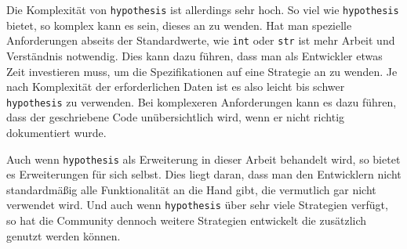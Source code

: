 Die Komplexität von \lstinline{hypothesis} ist allerdings sehr hoch. So viel wie
\lstinline{hypothesis} bietet, so komplex kann es sein, dieses an zu wenden. 
Hat man spezielle Anforderungen abseits der Standardwerte, wie \lstinline{int} 
oder \lstinline{str} ist mehr Arbeit und Verständnis notwendig. Dies kann dazu 
führen, dass man als Entwickler etwas Zeit investieren muss, um die 
Spezifikationen auf eine Strategie an zu wenden. Je nach Komplexität der 
erforderlichen Daten ist es also leicht bis schwer \lstinline{hypothesis}
zu verwenden. Bei komplexeren Anforderungen kann es dazu führen, dass der 
geschriebene Code unübersichtlich wird, wenn er nicht richtig dokumentiert 
wurde.

Auch wenn \lstinline{hypothesis} als Erweiterung in dieser Arbeit behandelt 
wird, so bietet es Erweiterungen für sich selbst. Dies liegt daran, dass man 
den Entwicklern nicht standardmäßig alle Funktionalität an die Hand gibt, die 
vermutlich gar nicht verwendet wird. Und auch wenn \lstinline{hypothesis} über 
sehr viele Strategien verfügt, so hat die Community dennoch weitere Strategien 
entwickelt die zusätzlich genutzt werden können.
